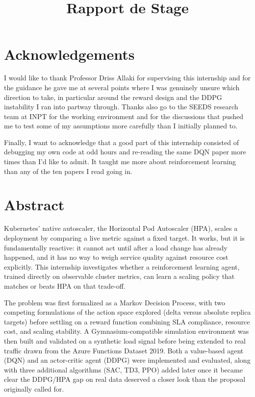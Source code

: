 \documentclass{rapportINPTCLOUD}
\title{Rapport de Stage}
\begin{document}

\fairemarges
\fairepagedegarde
\tabledematieres

\chapter*{Acknowledgements}

I would like to thank Professor Driss Allaki for supervising this internship and for the guidance he gave me at several points where I was genuinely unsure which direction to take, in particular around the reward design and the DDPG instability I ran into partway through. Thanks also go to the SEEDS research team at INPT for the working environment and for the discussions that pushed me to test some of my assumptions more carefully than I initially planned to.

Finally, I want to acknowledge that a good part of this internship consisted of debugging my own code at odd hours and re-reading the same DQN paper more times than I'd like to admit. It taught me more about reinforcement learning than any of the ten papers I read going in.

\clearpage

\chapter*{Abstract}

Kubernetes' native autoscaler, the Horizontal Pod Autoscaler (HPA), scales a deployment by comparing a live metric against a fixed target. It works, but it is fundamentally reactive: it cannot act until after a load change has already happened, and it has no way to weigh service quality against resource cost explicitly. This internship investigates whether a reinforcement learning agent, trained directly on observable cluster metrics, can learn a scaling policy that matches or beats HPA on that trade-off.

The problem was first formalized as a Markov Decision Process, with two competing formulations of the action space explored (delta versus absolute replica targets) before settling on a reward function combining SLA compliance, resource cost, and scaling stability. A Gymnasium-compatible simulation environment was then built and validated on a synthetic load signal before being extended to real traffic drawn from the Azure Functions Dataset 2019. Both a value-based agent (DQN) and an actor-critic agent (DDPG) were implemented and evaluated, along with three additional algorithms (SAC, TD3, PPO) added later once it became clear the DDPG/HPA gap on real data deserved a closer look than the proposal originally called for.
\end{document}
